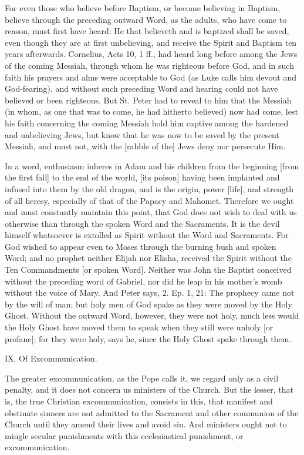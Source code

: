 For even those who believe before Baptism, or become believing
in Baptism, believe through the preceding outward Word, as the
adults, who have come to reason, must first have heard: He
that believeth and is baptized shall be saved, even though
they are at first unbelieving, and receive the Spirit and
Baptism ten years afterwards. Cornelius, Acts 10, 1 ff., had
heard long before among the Jews of the coming Messiah,
through whom he was righteous before God, and in such faith
his prayers and alms were acceptable to God (as Luke calls him
devout and God-fearing), and without such preceding Word and
hearing could not have believed or been righteous. But St.
Peter had to reveal to him that the Messiah (in whom, as one
that was to come, he had hitherto believed) now had come, lest
his faith concerning the coming Messiah hold him captive among
the hardened and unbelieving Jews, but know that he was now to
be saved by the present Messiah, and must not, with the
[rabble of the] Jews deny nor persecute Him.

In a word, enthusiasm inheres in Adam and his children from
the beginning [from the first fall] to the end of the world,
[its poison] having been implanted and infused into them by
the old dragon, and is the origin, power [life], and strength
of all heresy, especially of that of the Papacy and Mahomet.
Therefore we ought and must constantly maintain this point,
that God does not wish to deal with us otherwise than through
the spoken Word and the Sacraments. It is the devil himself
whatsoever is extolled as Spirit without the Word and
Sacraments. For God wished to appear even to Moses through the
burning bush and spoken Word; and no prophet neither Elijah
nor Elisha, received the Spirit without the Ten Commandments
[or spoken Word]. Neither was John the Baptist conceived
without the preceding word of Gabriel, nor did he leap in his
mother's womb without the voice of Mary. And Peter says,
2. Ep. 1, 21: The prophecy came not by the will of man; but
holy men of God spake as they were moved by the Holy Ghost.
Without the outward Word, however, they were not holy, much
less would the Holy Ghost have moved them to speak when they
still were unholy [or profane]; for they were holy, says he,
since the Holy Ghost spake through them.

IX. Of Excommunication.

The greater excommunication, as the Pope calls it, we regard
only as a civil penalty, and it does not concern us ministers
of the Church. But the lesser, that is, the true Christian
excommunication, consists in this, that manifest and obstinate
sinners are not admitted to the Sacrament and other communion
of the Church until they amend their lives and avoid sin. And
ministers ought not to mingle secular punishments with this
ecclesiastical punishment, or excommunication.

